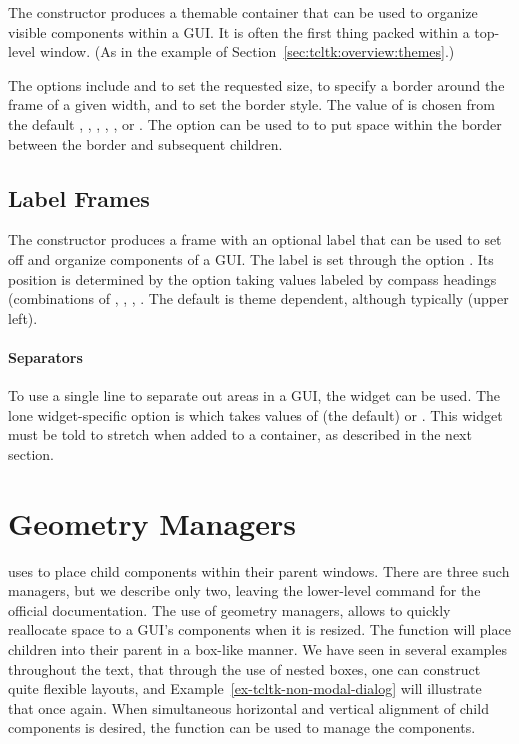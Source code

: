 The  constructor produces a themable container
that can be used to organize visible components within a GUI. It is
often the first thing packed within a top-level window. (As in the
example of Section~\ref{sec:tcltk:overview:themes}.)

The options include  and
 to set the requested size,
 to specify a border around the frame of
a given width, and  to set the border
style. The value of  is chosen from the default
, , , ,
, or .  The 
option can be used to to put space within the border between the
border and subsequent children.

\subsection{Label Frames}
\label{sec:tcltk:label-frames}

The  constructor produces a frame with an
optional label that can be used to set off and organize components of
a GUI. The label is set through the option
. Its position is determined by the option
 taking values labeled by compass
headings (combinations of , , , . The
default is theme dependent, although typically  (upper
left).

\paragraph{Separators}
To use a single line to separate out areas in a GUI, the
 widget can be used. The lone
widget-specific option is  which takes
values of  (the default) or . This
widget must be told to stretch when added to a container, as described
in the next section.

\section{Geometry Managers}
\label{sec:tcltk:geometry-managers}

\TCL\/ uses  to place child components within their
parent windows. There are three such managers, but we describe only
two, leaving the lower-level  command for the official documentation. The use of
geometry managers, allows \TK\/ to quickly reallocate space to a GUI's
components when it is resized.  The  function will
place children into their parent in a box-like manner. We have seen
in several examples throughout the text, that through the use of
nested boxes, one can construct quite flexible layouts, and
Example~\ref{ex-tcltk-non-modal-dialog} will illustrate that once
again. When simultaneous horizontal and vertical alignment of child
components is desired, the  function can be used to
manage the components.

